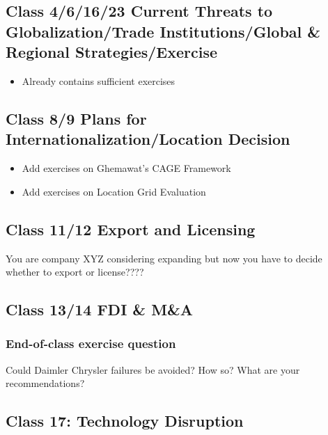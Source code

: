 \documentclass[
  11pt,
]{article}
\providecommand{\tightlist}{%
  \setlength{\itemsep}{0pt}\setlength{\parskip}{0pt}}
\begin{document}
\subsection{Class 4/6/16/23 Current Threats to Globalization/Trade
Institutions/Global \& Regional
Strategies/Exercise}\label{class-461623-current-threats-to-globalizationtrade-institutionsglobal-regional-strategiesexercise}

\begin{itemize}
\tightlist
\item
  Already contains sufficient exercises
\end{itemize}

\subsection{Class 8/9 Plans for Internationalization/Location
Decision}\label{class-89-plans-for-internationalizationlocation-decision}

\begin{itemize}
\tightlist
\item
  Add exercises on Ghemawat's CAGE Framework
\item
  Add exercises on Location Grid Evaluation
\end{itemize}

\subsection{Class 11/12 Export and
Licensing}\label{class-1112-export-and-licensing}

You are company XYZ considering expanding but now you have to decide
whether to export or license????

\subsection{Class 13/14 FDI \& M\&A}\label{class-1314-fdi-ma}

\subsubsection{End-of-class exercise
question}\label{end-of-class-exercise-question-2}

Could Daimler Chrysler failures be avoided? How so? What are your
recommendations?

\subsection{Class 17: Technology
Disruption}\label{class-17-technology-disruption}
\end{document}
